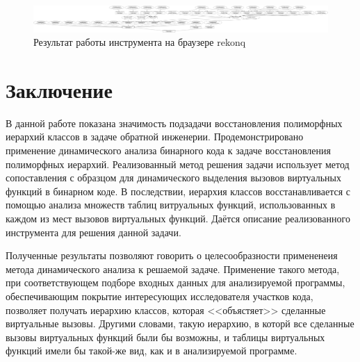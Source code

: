 \documentclass[a4paper,12pt,russian]{article}
\newcommand{\code}[1]{\textsf{#1}}
\begin{document}
\begin{figure}[b]
  \center
  \includegraphics[width=\textwidth]{rekonq-hier.png}
  \hfill
  \caption{Результат работы инструмента на браузере \code{rekonq}}
  \label{rekonq_res_fig}
\end{figure}

\clearpage
\newpage
\section{Заключение}
В данной работе показана значимость подзадачи восстановления полиморфных иерархий классов в задаче обратной инженерии.
Продемонстрировано применение динамического анализа бинарного кода к задаче восстановления полиморфных иерархий.
Реализованный метод решения задачи использует метод сопоставления с образцом для динамического выделения вызовов виртуальных функций в бинарном коде.
В последствии, иерархия классов восстанавливается с помощью анализа множеств таблиц витруальных функций, использованных в каждом из мест вызовов виртуальных функций.
Даётся описание реализованного инструмента для решения данной задачи.

Полученные результаты позволяют говорить о целесообразности примененеия метода динамического анализа к решаемой задаче.
Применение такого метода, при соответствующем подборе входных данных для анализируемой программы, обеспечивающим покрытие интересующих исследователя участков кода, позволяет получать иерархию классов, которая <<объястяет>> сделанные виртуальные вызовы.
Другими словами, такую иерархию, в которй все сделанные вызовы виртуальных функций были бы возможны, и таблицы виртуальных функций имели бы такой-же вид, как и в анализируемой программе.

\clearpage
\end{document}

